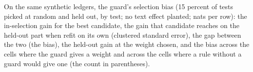 \begin{table}[t]\centering\scriptsize
\caption{On the same synthetic ledgers, the guard's selection bias (15 percent of tests picked at random and held out, by test; no text effect planted; nats per row): the in-selection gain for the best candidate, the gain that candidate reaches on the held-out part when refit on its own (clustered standard error), the gap between the two (the bias), the held-out gain at the weight chosen, and the bias across the cells where the guard gives a weight and across the cells where a rule without a guard would give one (the count in parentheses).}
\label{tab:guard-gain-held-out}
\resizebox{\textwidth}{!}{}
\end{table}

